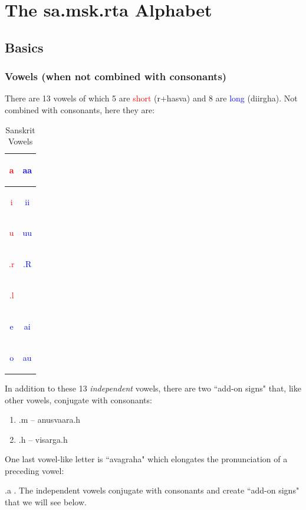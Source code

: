 \documentclass[a4paper, 12pt]{article}
\newcommand \sansletter[1]{
    \fontsize{2cm}{2.4cm}\selectfont
    \sans{#1}
}
\newcommand \eng[1]{
    \textenglish{#1}
}
\newcommand \sans[1]{
    \textsanskrit{#1}
}
\newcommand \shortsansletter[1]{
    \textcolor{red}{\sansletter{#1}}
}
\newcommand \longsansletter[1]{
    \textcolor{blue}{\sansletter{#1}}
}
\begin{document}
    \section {
        The \sans{sa.msk.rta} Alphabet
}
\subsection{Basics}
\subsubsection{Vowels (when not combined with consonants)}
\eng{
    There are 13 vowels of which 5 are \textcolor{red}{short} (\textsanskrit{r+hasva}) and 8 are \textcolor{blue}{long} (\textsanskrit{diirgha}). Not combined with consonants, here they are:
}

\begin{table}[hbp]
\begin{center}
    \caption{Sanskrit Vowels}
    \label{tab: vowels}
\begin{tabular}{|c|c|}
\hline
    \shortsansletter{a} &
    \longsansletter{aa}\\ 
    \hline
    \shortsansletter{i} &
    \longsansletter{ii} \\
    \hline
    \shortsansletter{u} &
    \longsansletter{uu} \\
    \hline
    \shortsansletter{.r} &
    \longsansletter{.R}\\
    \hline
    \shortsansletter{.l} &
    \sansletter{ }\\
    \hline
    \longsansletter{e} &
    \longsansletter{ai}\\
    \hline
    \longsansletter{o} &
    \longsansletter{au}\\
\hline
\end{tabular}
\end{center}
\end{table}
In addition to these 13 \emph{independent} vowels, there are two ``add-on signs" that, like other vowels, conjugate with consonants:
\begin{enumerate}
    \item \sans{.m} -- \sans{anusvaara.h} 
    \item \sans{.h} -- \sans{visarga.h}
\end{enumerate}

One last vowel-like letter is \sans{``avagraha"} which elongates the pronunciation of a preceding vowel:
\sans{.a}. The independent vowels conjugate with consonants and create ``add-on signs" that we will see below.
\end{document}
